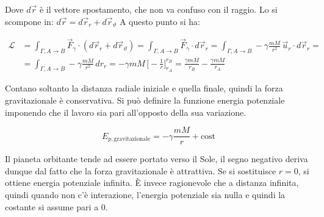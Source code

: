 \begin{figure}[htpb]
\end{figure}
\FloatBarrier
Dove $d\vec{r}$ è il vettore spostamento, che non va confuso con il raggio. Lo si scompone in: $d\vec{r}=d\vec{r}_r+d\vec{r}_\vartheta$
A questo punto si ha:

\begin{align*}
	\mathcal{L} &= \int_{\Gamma, A \to B} \vec{F}_\gamma \cdot (d\vec{r}_r+d\vec{r}_\vartheta)=\int_{\Gamma, A \to B} \vec{F}_\gamma \cdot d\vec{r}_r= \int_{\Gamma, A \to B} -\gamma \frac{mM}{r^2}\,\vec{u}_r \cdot d\vec{r}_r= \\
	&= \int_{\Gamma, A \to B} - \gamma \frac{mM}{r^2} \,dr_r=-\gamma mM\,\biggl[-\frac{1}{r}\biggr]_{r_A}^{r_B}=\frac{\gamma mM}{r_B}-\frac{\gamma mM}{r_A}
\end{align*}

Contano soltanto la distanza radiale iniziale e quella finale, quindi la forza gravitazionale è conservativa. Si può definire la funzione energia potenziale imponendo che il lavoro sia pari all'opposto della sua variazione.

\[
	\boxed{E_{p,\text{gravitazionale}}=-\gamma \frac{mM}{r}+\text{cost}}
\]

Il pianeta orbitante tende ad essere portato verso il Sole, il segno negativo deriva dunque dal fatto che la forza gravitazionale è attrattiva. Se si sostituisce $r=0$, si ottiene energia potenziale infinita. È invece ragionevole che a distanza infinita, quindi quando non c'è interazione, l'energia potenziale sia nulla e quindi la costante si assume pari a $0$.

